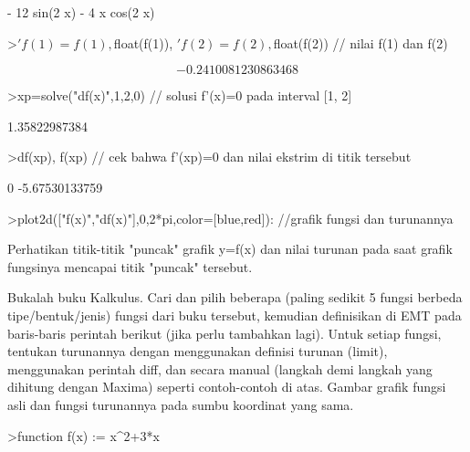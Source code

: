 \documentclass[a4paper,10pt]{article}
\begin{document}
\begin{eulernotebook}
\begin{eulercomment}
\begin{eulercomment}
\begin{eulercomment}
\begin{eulercomment}
\begin{euleroutput}
                       - 12 sin(2 x) - 4 x cos(2 x)
  
\end{euleroutput}
\begin{eulerprompt}
>$'f(1)=f(1), $float(f(1)), $'f(2)=f(2), $float(f(2)) // nilai f(1) dan f(2)
\end{eulerprompt}
\begin{eulerformula}
\[
-0.2410081230863468
\]
\end{eulerformula}
\begin{eulerprompt}
>xp=solve("df(x)",1,2,0) // solusi f'(x)=0 pada interval [1, 2]
\end{eulerprompt}
\begin{euleroutput}
  1.35822987384
\end{euleroutput}
\begin{eulerprompt}
>df(xp), f(xp) // cek bahwa f'(xp)=0 dan nilai ekstrim di titik tersebut
\end{eulerprompt}
\begin{euleroutput}
  0
  -5.67530133759
\end{euleroutput}
\begin{eulerprompt}
>plot2d(["f(x)","df(x)"],0,2*pi,color=[blue,red]): //grafik fungsi dan turunannya
\end{eulerprompt}
\begin{eulercomment}
Perhatikan titik-titik "puncak" grafik y=f(x) dan nilai turunan pada saat grafik fungsinya mencapai titik "puncak" tersebut.
\end{eulercomment}
\begin{eulercomment}
Bukalah buku Kalkulus. Cari dan pilih beberapa (paling sedikit 5 fungsi berbeda tipe/bentuk/jenis) fungsi dari buku tersebut,
kemudian definisikan di EMT pada baris-baris perintah berikut (jika perlu tambahkan lagi). Untuk setiap fungsi, tentukan turunannya
dengan menggunakan definisi turunan (limit), menggunakan perintah diff, dan secara manual (langkah demi langkah yang dihitung dengan
Maxima) seperti contoh-contoh di atas. Gambar grafik fungsi asli dan fungsi turunannya pada sumbu koordinat yang sama.
\end{eulercomment}
\begin{eulerprompt}
>function f(x) := x^2+3*x

\end{eulerprompt}
\end{eulercomment}
\end{eulercomment}
\end{eulercomment}
\end{eulercomment}
\end{eulernotebook}
\end{document}
